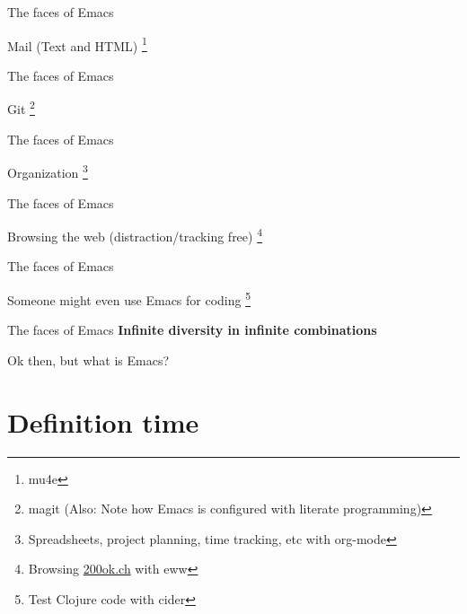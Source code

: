 \documentclass[bigger]{beamer}
\begin{document}
\begin{frame}[label={sec:org80bc5d7}]{The faces of Emacs}
\begin{block}{Mail (Text and HTML)}
 \footnote{mu4e}
\end{block}
\end{frame}

\begin{frame}[label={sec:orgfa78672}]{The faces of Emacs}
\begin{block}{Git}
 \footnote{magit (Also: Note how Emacs is configured with literate programming)}
\end{block}
\end{frame}

\begin{frame}[label={sec:org6677ae6}]{The faces of Emacs}
\begin{block}{Organization}
 \footnote{Spreadsheets, project planning, time tracking, etc with org-mode}
\end{block}
\end{frame}

\begin{frame}[label={sec:orgbb8850f}]{The faces of Emacs}
\begin{block}{Browsing the web (distraction/tracking free)}
 \footnote{Browsing \href{https://200ok.ch}{200ok.ch} with eww}
\end{block}
\end{frame}

\begin{frame}[label={sec:org555f19c}]{The faces of Emacs}
\begin{block}{Someone might even use Emacs for coding}
 \footnote{Test Clojure code with cider}
\end{block}
\end{frame}

\begin{frame}[label={sec:org169af7d}]{The faces of Emacs}
\center\textbf{Infinite diversity in infinite combinations}

\center Ok then, but what \alert{is} Emacs?
\end{frame}

\section{Definition time}
\label{sec:org2ec616a}
\end{document}
